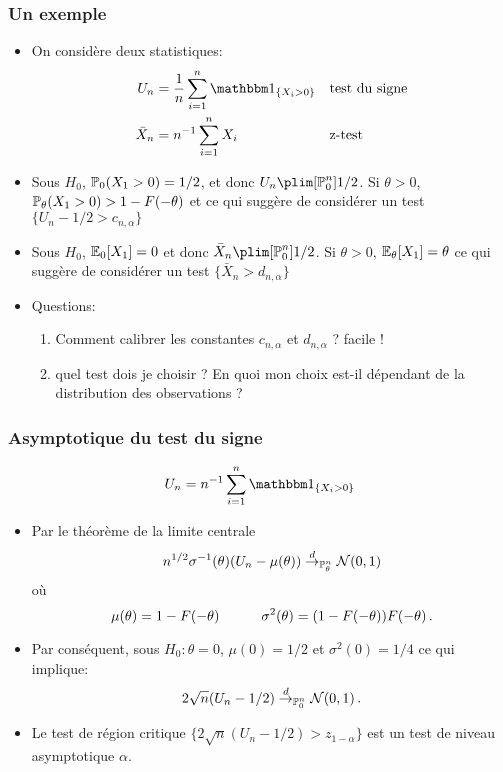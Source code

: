\begin{frame}
\frametitle{Un exemple}
\begin{itemize}
\item On considère deux statistiques:
\begin{align*}
U_n&= \frac{1}{n} \sum_{i=1}^n \indi{X_i > 0} &&\text{test du signe} \\
\bar{X}_n&= n^{-1} \sum_{i=1}^n X_i     &&\text{z-test}
\end{align*}
\item  Sous $H_0$, $\operatorname{{\mathbb P}}_0( X_1 > 0)=1/2$, et donc $U_n \plim[\PP_{0}^n] 1/2$. Si $\theta > 0$, $\operatorname{{\mathbb P}}_\theta(X_1 > 0) >  1 - F(-\theta)$ et
ce qui suggère de considérer un test $\{ U_n -1/2 > c_{n,\alpha} \}$
\item Sous $H_0$,  $\operatorname{{\mathbb E}}_0[X_1]= 0$ et donc $\bar{X}_n \plim[\PP_{0}^n] 1/2$. Si $\theta > 0$, $\operatorname{{\mathbb E}}_\theta[X_1]= \theta$ ce qui suggère de
considérer un test $\{ \bar{X}_n > d_{n,\alpha} \}$
\item \alert{Questions:}
\begin{enumerate}
\item Comment calibrer  les constantes $c_{n,\alpha}$  et $d_{n,\alpha}$ ? facile !
\item quel test dois je choisir ? En quoi mon choix est-il dépendant de la distribution des observations ?
\end{enumerate}
\end{itemize}
\end{frame}

\begin{frame}
\frametitle{Asymptotique du test du signe}
$$
U_n= n^{-1} \sum_{i=1}^n \indi{X_i > 0}
$$
\begin{itemize}
\item Par le théorème de la limite centrale
$$
n^{1/2} \sigma^{-1}(\theta) (U_n - \mu(\theta)) \stackrel{d}{\rightarrow}_{\operatorname{{\mathbb P}}^n_\theta} \mathcal{N}(0,1)
$$
où
\[
\mu(\theta) = 1 - F(-\theta) \quad \qquad \sigma^2(\theta) = (1-F(-\theta)) F(-\theta) \,.
\]
\item Par conséquent, sous $H_0: \theta = 0$, $\mu(0)=1/2$ et $\sigma^2(0)= 1/4$ ce qui implique:
\[
2 \sqrt{n} (U_n - 1/2) \stackrel{d}{\rightarrow}_{\operatorname{{\mathbb P}}^n_0} \mathcal{N}(0,1) \,.
\]
\item Le test de région critique  $\{ 2 \sqrt{n} (U_n -1/2) > z_{ 1-\alpha} \}$ est un test de niveau asymptotique $\alpha$.
\end{itemize}
\end{frame}

